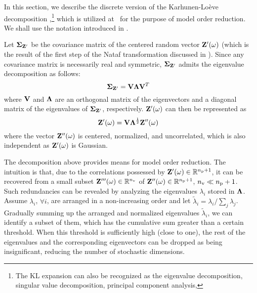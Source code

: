 In this section, we describe the discrete version of the Karhunen-Lo\`{e}ve decomposition \cite{ghanem1991},\footnote{The KL expansion can also be recognized as the eigenvalue decomposition, singular value decomposition, principal component analysis, \etc} which is utilized at \ for the purpose of model order reduction.
We shall use the notation introduced in .

Let $\mCov_{\vZ'}$ be the covariance matrix of the centered random vector $\mathbf{Z}'(\omega)$ (which is the result of the first step of the Nataf transformation discussed in ).
  Since any covariance matrix is necessarily real and symmetric, $\mCov_{\vZ'}$ admits the eigenvalue decomposition \cite{press2007} as follows:
\[
  \mCov_{\vZ'} = \m{V} \m{\Lambda} \m{V}^T
\]
where $\m{V}$ and $\m{\Lambda}$ are an orthogonal matrix of the eigenvectors and a diagonal matrix of the eigenvalues of $\mCov_{\vZ'}$, respectively.
$\mathbf{Z}'(\omega)$ can then be represented as
\[
  \vZ'(\o) = \m{V} \m{\Lambda}^\frac{1}{2} \vZ''(\o)
\]
where the vector $\mathbf{Z}''(\omega)$ is centered, normalized, and uncorrelated, which is also independent as $\mathbf{Z}'(\omega)$ is Gaussian.

The decomposition above provides means for model order reduction.
The intuition is that, due to the correlations possessed by $\mathbf{Z}'(\omega) \in \mathbb{R}^{{n_\text{p}} + 1}$, it can be recovered from a small subset $\mathbf{Z}'''(\omega) \in \mathbb{R}^{n_\text{v}}$ of $\mathbf{Z}''(\omega) \in \mathbb{R}^{{n_\text{p}} + 1}$, ${n_\text{v}} \ll {n_\text{p}} + 1$.
Such redundancies can be revealed by analyzing the eigenvalues $\lambda_i$ stored in $\m{\Lambda}$.
Assume $\lambda_i$, $\forall i$, are arranged in a non-increasing order and let $\tilde{\lambda}_i = \lambda_i / \sum_j \lambda_j$.
Gradually summing up the arranged and normalized eigenvalues $\tilde{\lambda}_i$, we can identify a subset of them, which has the cumulative sum greater than a certain threshold.
When this threshold is sufficiently high (close to one), the rest of the eigenvalues and the corresponding eigenvectors can be dropped as being insignificant, reducing the number of stochastic dimensions.
